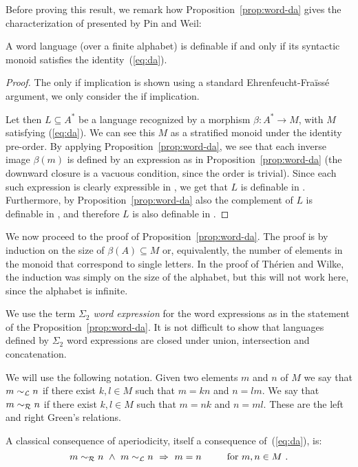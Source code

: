 \documentclass{LMCS}
\begin{document}
  Before proving this result, we remark how
  Proposition~\ref{prop:word-da} gives the
characterization of \Dtwo presented by Pin and Weil:
\begin{cor}
  A word language (over a finite alphabet) is definable \Dtwo if and only if
  its syntactic monoid satisfies the identity~(\ref{eq:da}).
\end{cor}
\begin{proof}
  The only if implication is shown using a standard
  Ehrenfeucht-Fraïssé argument, we only consider the if implication.

  Let then $L\subseteq A^*$ be a language recognized by a morphism
  $\beta : A^* \to M$, with $M$ satisfying (\ref{eq:da}). We can see
  this $M$ as a stratified monoid under the identity pre-order. By
  applying Proposition~\ref{prop:word-da}, we see that each inverse
  image $\beta(m)$ is defined by an expression as in
  Proposition~\ref{prop:word-da} (the downward closure is a vacuous
  condition, since the order is trivial). Since each such expression
  is clearly expressible in \Stwo, we get that $L$ is definable
  in \Stwo. Furthermore, by Proposition~\ref{prop:word-da} also
  the complement of $L$ is definable in \Stwo, and therefore $L$
  is also definable in \Ptwo.
\end{proof}


We now proceed to the proof of Proposition~\ref{prop:word-da}.  The proof is by
induction on the size of $\beta(A) \subseteq M$ or, equivalently, the number of
elements in the monoid that correspond to single letters. In the proof
of Thérien and Wilke, the induction was simply on the size of the alphabet,
but this will not work here, since the alphabet is infinite.

 We use the term
\emph{$\Sigma_2$ word expression} for the word expressions as in the
statement of the Proposition~\ref{prop:word-da}. It is not difficult to
show that languages defined by $\Sigma_2$ word expressions are closed under
union, intersection and concatenation.

We will use the following notation. Given two elements $m$ and $n$ of $M$ we
say that $m \sim_{\mathcal L} n$ if there exist $k,l \in M$ such that $m=kn$ and $n=lm$. We
say that $m \sim_{\mathcal R} n$ if there exist $k,l \in M$ such that $m=nk$
and $n=ml$. These are the left and right Green's relations.

A classical consequence of aperiodicity, itself a consequence
of~(\ref{eq:da}), is:
\begin{equation}\label{eq:wilke2}
  m \rgreensim n\  \land \  m \lgreensim n \ \Rightarrow \ m=n\ 
  \qquad \mbox{ for }m,n \in M\ .
\end{equation}
\end{document}
